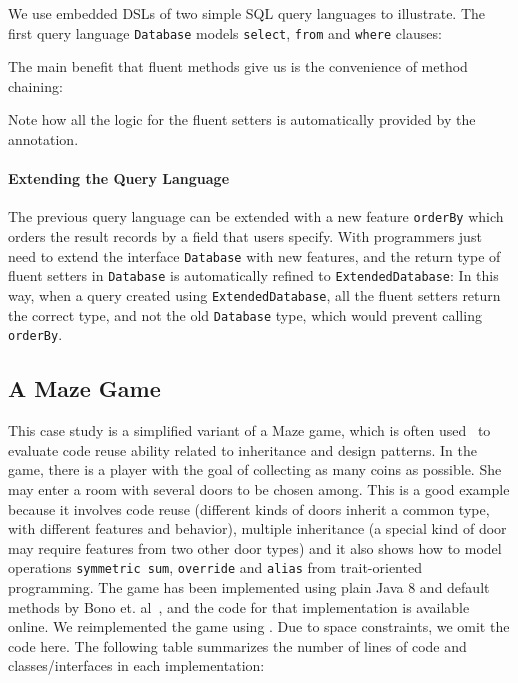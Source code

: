 \noindent We use embedded DSLs of two simple SQL query languages to illustrate.
The first query language \texttt{Database}  models
\texttt{select}, \texttt{from} and \texttt{where} clauses:

\noindent The main benefit that fluent methods give
us is the convenience of method chaining:


\noindent Note how all the logic for the fluent setters is automatically provided by the \mixin annotation.

\paragraph{Extending the Query Language} The previous query language can be extended with a new feature
\texttt{orderBy} which orders the result records by a field that users
specify. With \mixin programmers just need to extend the interface \texttt{Database} with new
features, and the return type of fluent setters in
\texttt{Database} is automatically refined to \texttt{ExtendedDatabase}:
In this way, when a query created using \texttt{ExtendedDatabase},
all the fluent setters return the correct type, and not the old \texttt{Database} type, which would prevent calling
\texttt{orderBy}.


\subsection{A Maze Game}
This case study is a simplified variant of a Maze game, which is often
used~\cite{gof,bono14}
to evaluate code reuse ability related to inheritance and design
patterns. In the game, there is a player with the goal of collecting
as many coins as possible. She may enter a room with several doors to
be chosen among. This is a good example because it involves code reuse
(different kinds of doors inherit a common type, with different
features and behavior), multiple inheritance (a special kind of door
may require features from two other door types) and it also shows how
to model operations \texttt{symmetric sum}, \texttt{override} and
\texttt{alias} from trait-oriented programming. The game has been
implemented using plain Java 8 and default methods by Bono
et. al~\cite{bono14}, and the code for that implementation is
available online. We reimplemented the game using \mixin. Due to space
constraints, we omit the code here. The following table summarizes
the number of lines of code and classes/interfaces in each implementation:

